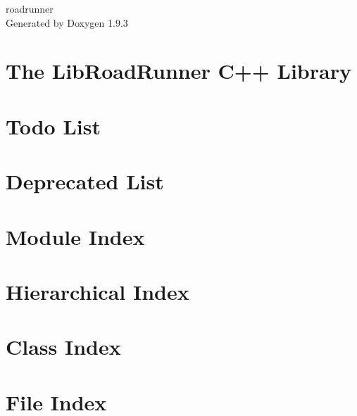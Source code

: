 \documentclass[twoside]{book}
\newcommand{\+}{\discretionary{\mbox{\scriptsize$\hookleftarrow$}}{}{}}
\newcommand{\clearemptydoublepage}{%
    \newpage{\pagestyle{empty}\cleardoublepage}%
  }
\begin{document}
  \raggedbottom
    \hypersetup{pageanchor=false,
                bookmarksnumbered=true,
                pdfencoding=unicode
               }
  \begin{titlepage}
  \vspace*{7cm}
  \begin{center}%
  {\Large roadrunner}\\
  \vspace*{1cm}
  {\large Generated by Doxygen 1.9.3}\\
  \end{center}
  \end{titlepage}
  \clearemptydoublepage
  \tableofcontents
  \clearemptydoublepage
  \hypersetup{pageanchor=true}
\chapter{The Lib\+Road\+Runner C++ Library}
\label{index}\hypertarget{index}{}
\chapter{Todo List}
\label{todo}

\chapter{Deprecated List}
\label{deprecated}

\chapter{Module Index}

\chapter{Hierarchical Index}

\chapter{Class Index}

\chapter{File Index}

\end{document}
